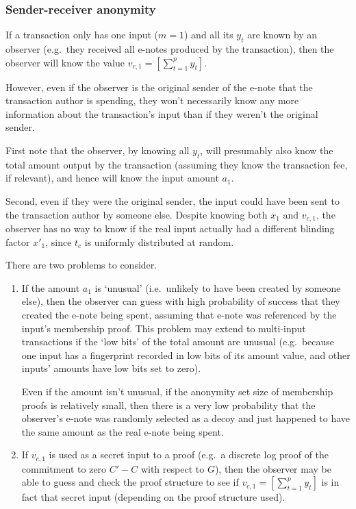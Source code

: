 \subsubsection{Sender-receiver anonymity}
\label{subsubsec:confidential-transactions-sender-receiver-anonymity}

If a transaction only has one input ($m = 1$) and all its $y_t$ are known by an observer (e.g.\ they received all e-notes produced by the transaction), then the observer will know the value $v_{c,1} = [\sum^{p}_{t=1} y_t]$.

However, even if the observer is the original sender of the e-note that the transaction author is spending, they won't necessarily know any more information about the transaction's input than if they weren't the original sender.

First note that the observer, by knowing all $y_t$, will presumably also know the total amount output by the transaction (assuming they know the transaction fee, if relevant), and hence will know the input amount $a_1$.

Second, even if they were the original sender, the input could have been sent to the transaction author by someone else. Despite knowing both $x_1$ and $v_{c,1}$, the observer has no way to know if the real input actually had a different blinding factor $x'_1$, since $t_c$ is uniformly distributed at random.

There are two problems to consider.
\begin{enumerate}
    \item If the amount $a_1$ is `unusual' (i.e.\ unlikely to have been created by someone else), then the observer can guess with high probability of success that they created the e-note being spent, assuming that e-note was referenced by the input's membership proof. This problem may extend to multi-input transactions if the `low bits' of the total amount are unusual (e.g.\ because one input has a fingerprint recorded in low bits of its amount value, and other inputs' amounts have low bits set to zero).

    Even if the amount isn't unusual, if the anonymity set size of membership proofs is relatively small, then there is a very low probability that the observer's e-note was randomly selected as a decoy and just happened to have the same amount as the real e-note being spent.

    \item If $v_{c,1}$ is used as a secret input to a proof (e.g.\ a discrete log proof of the commitment to zero $C' - C$ with respect to $G$), then the observer may be able to guess and check the proof structure to see if $v_{c,1} = [\sum^{p}_{t=1} y_t]$ is in fact that secret input (depending on the proof structure used).
\end{enumerate}

